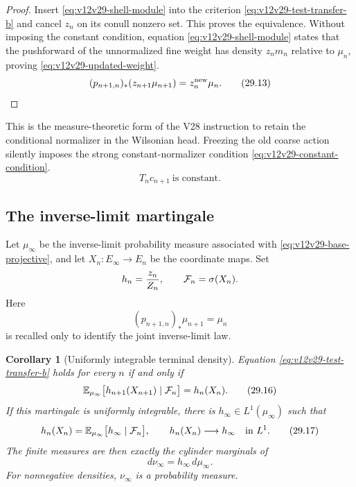\documentclass[11pt]{article}
\newtheorem{corollary}[theorem]{Corollary}
\theoremstyle{remark}
\begin{document}
\begin{proof}
Insert \eqref{eq:v12v29-shell-module} into the criterion
\eqref{eq:v12v29-test-transfer-b} and cancel \(z_n\) on its conull
nonzero set.  This proves the equivalence.  Without imposing the
constant condition, equation \eqref{eq:v12v29-shell-module} states
that the pushforward of the unnormalized fine weight has density
\(z_nm_n\) relative to \(\mu_n\), proving
\eqref{eq:v12v29-updated-weight}.
\begin{equation}
 (p_{n+1,n})_*(z_{n+1}\mu_{n+1})
 =
 z_n^{\rm new}\mu_n.                            \tag{29.13}
 \label{eq:v12v29-updated-weight}
\end{equation}
\end{proof}

This is the measure-theoretic form of the V28 instruction to retain
the conditional normalizer in the Wilsonian head.  Freezing the old
coarse action silently imposes the strong constant-normalizer
condition \eqref{eq:v12v29-constant-condition}.
\begin{equation}
 T_nc_{n+1}\ \text{is constant}.                \tag{29.14}
 \label{eq:v12v29-constant-condition}
\end{equation}

\subsection{The inverse-limit martingale}

Let \(\mu_\infty\) be the inverse-limit probability measure associated
with \eqref{eq:v12v29-base-projective}, and let
\(X_n:E_\infty\to E_n\) be the coordinate maps.  Set
\[
 h_n={z_n\over Z_n},
 \qquad
 {\cal F}_n=\sigma(X_n).
\]
Here
\begin{equation}
 (p_{n+1,n})_*\mu_{n+1}=\mu_n                  \tag{29.15}
 \label{eq:v12v29-base-projective}
\end{equation}
is recalled only to identify the joint inverse-limit law.

\begin{corollary}[Uniformly integrable terminal density]
\label{cor:v12v29-terminal-density}
Equation \eqref{eq:v12v29-test-transfer-b} holds for every \(n\) if
and only if
\begin{equation}
 {\mathbb E}_{\mu_\infty}
 \bigl[h_{n+1}(X_{n+1})\mid{\cal F}_n\bigr]
 =
 h_n(X_n).                                      \tag{29.16}
\end{equation}
If this martingale is uniformly integrable, there is
\(h_\infty\in L^1(\mu_\infty)\) such that
\begin{equation}
 h_n(X_n)
 =
 {\mathbb E}_{\mu_\infty}
 \bigl[h_\infty\mid{\cal F}_n\bigr],
 \qquad
 h_n(X_n)\longrightarrow h_\infty
 \quad\text{in \(L^1\)}.                         \tag{29.17}
\end{equation}
The finite measures are then exactly the cylinder marginals of
\begin{equation}
 d\nu_\infty=h_\infty\,d\mu_\infty.             \tag{29.18}
\end{equation}
For nonnegative densities, \(\nu_\infty\) is a probability measure.
\end{corollary}
\end{document}
